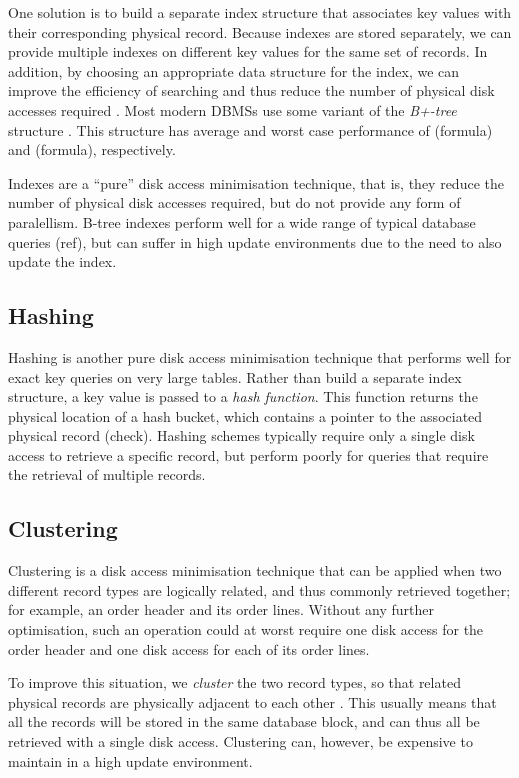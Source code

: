 \documentclass{llncs}
\begin{document}
One solution is to build a separate index structure that associates key values with their corresponding physical record. Because indexes are stored separately, we can provide multiple indexes on different key values for the same set of records. In addition, by choosing an appropriate data structure for the index, we can improve the efficiency of searching and thus reduce the number of physical disk accesses required \cite{Roti-S-1996}. Most modern DBMSs use some variant of the \emph{B+-tree} structure \cite{Knut-DE-1997-Art}. This structure has average and worst case performance of (formula) and (formula), respectively.

Indexes are a ``pure'' disk access minimisation technique, that is, they reduce the number of physical disk accesses required, but do not provide any form of paralellism. B-tree indexes perform well for a wide range of typical database queries (ref), but can suffer in high update environments due to the need to also update the index.


\subsection{Hashing}

Hashing is another pure disk access minimisation technique that performs well for exact key queries on very large tables. Rather than build a separate index structure, a key value is passed to a \emph{hash function}. This function returns the physical location of a hash bucket, which contains a pointer to the associated physical record (check). Hashing schemes typically require only a single disk access to retrieve a specific record, but perform poorly for queries that require the retrieval of multiple records.


\subsection{Clustering}

Clustering is a disk access minimisation technique that can be applied when two different record types are logically related, and thus commonly retrieved together; for example, an order header and its order lines. Without any further optimisation, such an operation could at worst require one disk access for the order header and one disk access for each of its order lines.

To improve this situation, we \emph{cluster} the two record types, so that related physical records are physically adjacent to each other \cite{Chan-N-2003-clustering}. This usually means that all the records will be stored in the same database block, and can thus all be retrieved with a single disk access. Clustering can, however, be expensive to maintain in a high update environment.
\end{document}
